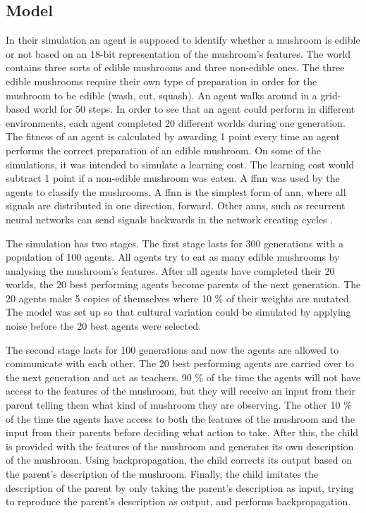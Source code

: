 \subsection{Model}
 In their simulation an agent is supposed to identify whether a mushroom is edible or not based on an 18-bit representation of the mushroom's features. The world contains three sorts of edible mushrooms and three non-edible ones. The three edible mushrooms require their own type of preparation in order for the mushroom to be edible (wash, cut, squash). An agent walks around in a grid-based world for 50 steps. In order to see that an agent could perform in different environments, each agent completed 20 different worlds during one generation. The fitness of an agent is calculated by awarding 1 point every time an agent performs the correct preparation of an edible mushroom. On some of the simulations, it was intended to simulate a learning cost. The learning cost would subtract 1 point if a non-edible mushroom was eaten. A \ac{ffnn}  was used by the agents to classify the mushrooms. A \ac{ffnn} is the simplest form of \ac{ann}, where all signals are distributed in one direction, forward. Other \acp{ann}, such as recurrent neural networks can send signals backwards in the network creating cycles \citep{jain1996artificial}.

The simulation has two stages. The first stage lasts for 300 generations with a population of 100 agents. All agents try to eat as many edible mushrooms by analysing the mushroom's features. After all agents have completed their 20 worlds, the 20 best performing agents become parents of the next generation. The 20 agents make 5 copies of themselves where 10 \% of their weights are mutated. The model was set up so that cultural variation could be simulated by applying noise before the 20 best agents were selected.

The second stage lasts for 100 generations and now the agents are allowed to communicate with each other. The 20 best performing agents are carried over to the next generation and act as teachers. 90 \% of the time the agents will not have access to the features of the mushroom, but they will receive an input from their parent telling them what kind of mushroom they are observing. The other 10 \% of the time the agents have access to both the features of the mushroom and the input from their parents before deciding what action to take. After this, the child is provided with the features of the mushroom and generates its own description of the mushroom. Using backpropagation, the child corrects its output based on the parent's description of the mushroom. Finally, the child imitates the description of the parent by only taking the parent's description as input, trying to reproduce the parent's description as output, and performs backpropagation.

